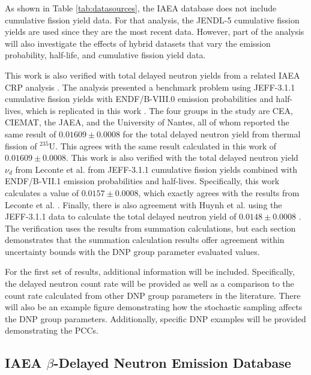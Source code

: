 \documentclass[hidelinks]{style/nseJournal}
\begin{document}
As shown in Table \ref{tab:datasources}, the \gls{IAEA} database does not include cumulative fission yield data.
For that analysis, the JENDL-5 cumulative fission yields are used since they are the most recent data.
However, part of the analysis will also investigate the effects of hybrid datasets that vary the emission probability, half-life, and cumulative fission yield data.

This work is also verified with total delayed neutron yields from a related \gls{IAEA} \gls{CRP} analysis \cite{DIMITRIOU2021144}.
The analysis presented a benchmark problem using JEFF-3.1.1 cumulative fission yields with ENDF/B-VIII.0 emission probabilities and half-lives, which is replicated in this work \cite{santamarina2009jeff, Brown20181}.
The four groups in the study are \gls{CEA}, \gls{CIEMAT}, the \gls{JAEA}, and the University of Nantes, all of whom reported the same result of $0.01609 \pm 0.0008$ for the total delayed neutron yield from thermal fission of $^{235}$U.
This agrees with the same result calculated in this work of $0.01609 \pm 0.0008$.
This work is also verified with the total delayed neutron yield $\nu_d$ from Leconte et al. from JEFF-3.1.1 cumulative fission yields combined with ENDF/B-VII.1 emission probabilities and half-lives.
Specifically, this work calculates a value of $0.0157 \pm 0.0008$, which exactly agrees with the results from Leconte et al. \cite{leconte2020new}.
Finally, there is also agreement with Huynh et al. using the JEFF-3.1.1 data to calculate the total delayed neutron yield of $0.0148 \pm 0.0008$ \cite{huynh2014calculation}.
The verification uses the results from summation calculations, but each section demonstrates that the summation calculation results offer agreement within uncertainty bounds with the \gls{DNP} group parameter evaluated values.

For the first set of results, additional information will be included.
Specifically, the delayed neutron count rate will be provided as well as a comparison to the count rate calculated from other \gls{DNP} group parameters in the literature.
There will also be an example figure demonstrating how the stochastic sampling affects the \gls{DNP} group parameters.
Additionally, specific \gls{DNP} examples will be provided demonstrating the \glspl{PCC}.

\FloatBarrier

\subsection{IAEA $\beta$-Delayed Neutron Emission Database}
\label{sec:iaea-jendl5}
\end{document}
